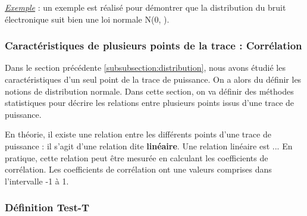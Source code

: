 \documentclass[10pt, oneside, a4paper]{article}
\begin{document}
\underline{\textit{Exemple}} : un exemple est réalisé pour démontrer que la distribution du bruit électronique suit bien une loi normale N(0, \sigma).

\subsubsection{Caractéristiques de plusieurs points de la trace : Corrélation}
Dans le section précédente \ref{subsubsection:distribution}, nous avons étudié les caractéristiques d'un seul point de la trace de puissance. On a alors du définir les notions de distribution normale. Dans cette section, on va définir des méthodes statistiques pour décrire les relations entre plusieurs points issus d'une trace de puissance. 

En théorie, il existe une relation entre les différents points d'une trace de puissance : il s'agit d'une relation dite \textbf{ linéaire}. Une relation linéaire est ... 
En pratique, cette relation peut être mesurée en calculant les coefficients de corrélation. Les coefficients de corrélation ont une valeurs comprises dans l'intervalle -1 à 1.

\newpage

\subsubsection{Définition Test-T}
\end{document}
